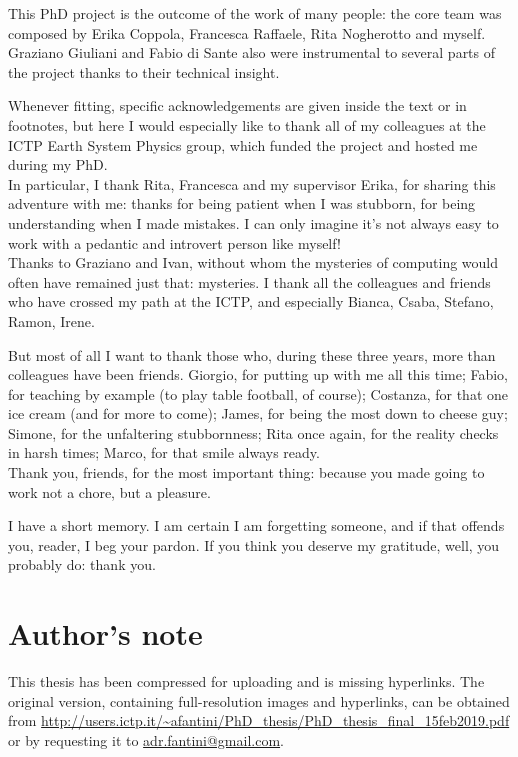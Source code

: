 \begin{acknowledgements}
\addchaptertocentry{\acknowledgementname} %
This PhD project is the outcome of the work of many people: the core team was composed by Erika Coppola, Francesca Raffaele, Rita Nogherotto and myself. Graziano Giuliani and Fabio di Sante also were instrumental to several parts of the project thanks to their technical insight. 

Whenever fitting, specific acknowledgements are given inside the text or in footnotes, but here I would especially like to thank all of my colleagues at the ICTP Earth System Physics group, which funded the project and hosted me during my PhD.\\
In particular, I thank Rita, Francesca and my supervisor Erika, for sharing this adventure with me: thanks for being patient when I was stubborn, for being understanding when I made mistakes.
I can only imagine it's not always easy to work with a pedantic and introvert person like myself!\\
Thanks to Graziano and Ivan, without whom the mysteries of computing would often have remained just that: mysteries.
I thank all the colleagues and friends who have crossed my path at the ICTP, and especially Bianca, Csaba, Stefano, Ramon, Irene.

But most of all I want to thank those who, during these three years, more than colleagues have been friends.
Giorgio, for putting up with me all this time; Fabio, for teaching by example (to play table football, of course); Costanza, for that one ice cream (and for more to come); James, for being the most down to cheese guy; Simone, for the unfaltering stubbornness; Rita once again, for the reality checks in harsh times; Marco, for that smile always ready.\\
Thank you, friends, for the most important thing: because you made going to work not a chore, but a pleasure. 

I have a short memory. I am certain I am forgetting someone, and if that offends you, reader, I beg your pardon. If you think you deserve my gratitude, well, you probably do: thank you.

\newpage
\section*{Author's note}
This thesis has been compressed for uploading and is missing hyperlinks.
The original version, containing full-resolution images and hyperlinks, can be obtained from \url{http://users.ictp.it/~afantini/PhD_thesis/PhD_thesis_final_15feb2019.pdf} or by requesting it to \href{mailto:adr.fantini@gmail.com}{adr.fantini@gmail.com}.


\end{acknowledgements}